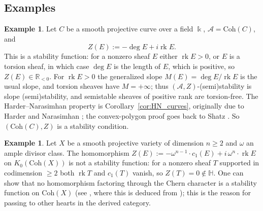 \documentclass[12pt]{amsart}
\numberwithin{theorem}{section}
\theoremstyle{definition}
\newtheorem{example}[theorem]{Example}
\newcommand{\RR}{\mathbb{R}}
\newcommand{\HH}{\mathbb{H}}
\newcommand{\calA}{\mathcal{A}}
\newcommand{\kk}{\Bbbk}
\newcommand{\Kgroup}{K_0}
\begin{document}
	
	\subsection{Examples}
	
	\begin{example}
		Let $C$ be a smooth projective curve over a field $\kk$, $\calA = \mathrm{Coh}(C)$, and
		\[
		Z(E) := -\deg E + i \operatorname{rk} E .
		\]
		This is a stability function: for a nonzero sheaf $E$ either $\operatorname{rk} E > 0$, or $E$ is a torsion sheaf, in which case $\deg E$ is the length of $E$, which is positive, so $Z(E) \in \RR_{<0}$. For $\operatorname{rk} E > 0$ the generalized slope $M(E) = \deg E / \operatorname{rk} E$ is the usual slope, and torsion sheaves have $M = +\infty$; thus $(\calA, Z)$-(semi)stability is slope (semi)stability, and semistable sheaves of positive rank are torsion-free. The Harder--Narasimhan property is Corollary~\ref{cor:HN_curves}, originally due to Harder and Narasimhan \cite{HN75}; the convex-polygon proof goes back to Shatz \cite{Sha77}. So $(\mathrm{Coh}(C), Z)$ is a stability condition.
	\end{example}
	
	\begin{example}
		\label{ex:surfaces}
		Let $X$ be a smooth projective variety of dimension $n \geqslant 2$ and $\omega$ an ample divisor class. The homomorphism $Z(E) := -\omega^{n-1} \cdot c_1(E) + i \, \omega^n \cdot \operatorname{rk} E$ on $\Kgroup(\mathrm{Coh}(X))$ is not a stability function: for a nonzero sheaf $T$ supported in codimension $\geqslant 2$ both $\operatorname{rk} T$ and $c_1(T)$ vanish, so $Z(T) = 0 \notin \HH$. One can show that no homomorphism factoring through the Chern character is a stability function on $\mathrm{Coh}(X)$ (see \cite[Example~4.3]{MS17}, where this is deduced from \cite[Lemma~2.7]{Tod09}); this is the reason for passing to other hearts in the derived category.
	\end{example}
	
\end{document}
